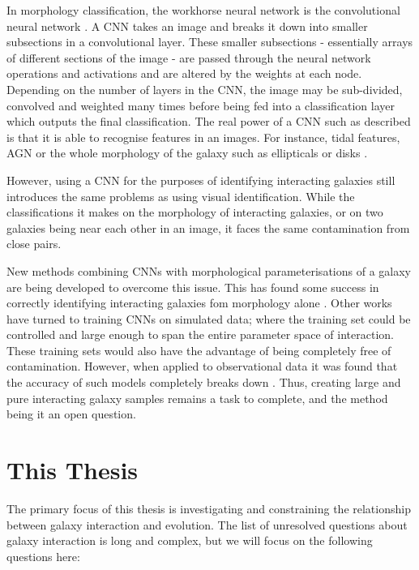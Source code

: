 In morphology classification, the workhorse neural network is the convolutional neural network \citep[CNN; examples include][]{2010MNRAS.406..342B, 2015ApJS..221....8H, 2020MNRAS.491.1554W, 2023ApJ...944..124T}. A CNN takes an image and breaks it down into smaller subsections in a convolutional layer. These smaller subsections - essentially arrays of different sections of the image - are passed through the neural network operations and activations and are altered by the weights at each node. Depending on the number of layers in the CNN, the image may be sub-divided, convolved and weighted many times before being fed into a classification layer which outputs the final classification. The real power of a CNN such as described is that it is able to recognise features in an images. For instance, tidal features, AGN or the whole morphology of the galaxy such as ellipticals or disks \citep[e.g][]{2018MNRAS.479..415A,2020ApJ...895..112G, 2022MNRAS.511.3330T, 2023ApJ...944..124T}. 

However, using a CNN for the purposes of identifying interacting galaxies still introduces the same problems as using visual identification. While the classifications it makes on the morphology of interacting galaxies, or on two galaxies being near each other in an image, it faces the same contamination from close pairs.

New methods combining CNNs with morphological parameterisations of a galaxy are being developed to overcome this issue. This has found some success in correctly identifying interacting galaxies fom morphology alone \citep{2023ApJ...958...96R}. Other works have turned to training CNNs on simulated data; where the training set could be controlled and large enough to span the entire parameter space of interaction. These training sets would also have the advantage of being completely free of contamination. However, when applied to observational data it was found that the accuracy of such models completely breaks down \citep{2019MNRAS.490.5390B, 2020A&C....3200390C}. Thus, creating large and pure interacting galaxy samples remains a task to complete, and the method being it an open question.

\section{This Thesis}
\noindent The primary focus of this thesis is investigating and constraining the relationship between galaxy interaction and evolution. The list of unresolved questions about galaxy interaction is long and complex, but we will focus on the following questions here:

